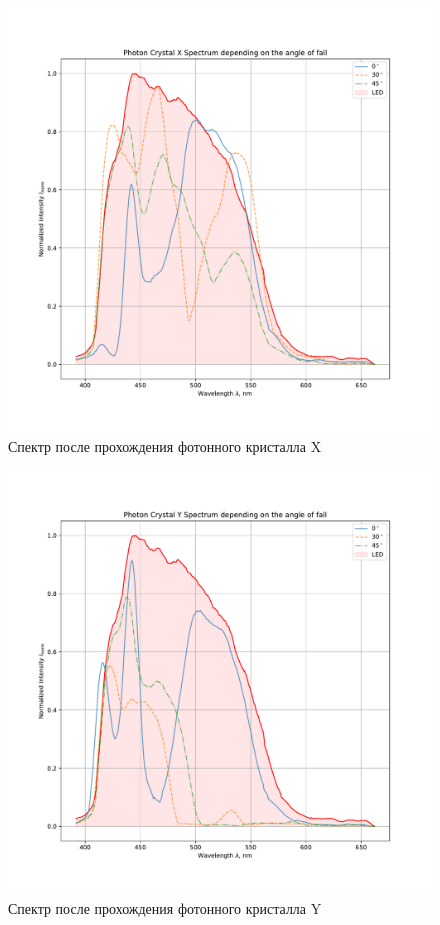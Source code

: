 \documentclass[a4paper, 12pt]{article}
\begin{document}
\begin{figure}[H]
	\centering
	\includegraphics[width=0.7\linewidth]{x.pdf}
	\caption{Спектр после прохождения фотонного кристалла X}
	\label{fig:x}
\end{figure}

\begin{figure}[H]
	\centering
	\includegraphics[width=0.7\linewidth]{y.pdf}
	\caption{Спектр после прохождения фотонного кристалла Y}
	\label{fig:y}
\end{figure}
\end{document}
